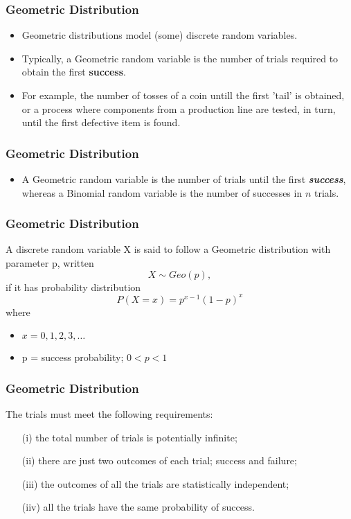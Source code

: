 \documentclass{beamer}
\begin{document}
\begin{frame}

\end{frame}
\begin{frame}
\frametitle{Geometric Distribution}
\Large
\begin{itemize}

\item Geometric distributions model (some) discrete random variables.
\item  Typically, a Geometric random variable is the number of trials required to obtain the first \textbf{success}.
\item For example, the number of tosses of a coin untill the first 'tail' is obtained, or a process where components from a production line are tested, in turn, until the first defective item is found.

\end{itemize}
\end{frame}
\begin{frame}
\frametitle{Geometric Distribution}
\Large
\begin{itemize}
\item A Geometric random variable is the number of trials until the first \textit{\textbf{success}}, whereas a Binomial random variable is the number of successes in $n$ trials.
\end{itemize}
\end{frame}
\begin{frame}
\frametitle{Geometric Distribution}
\Large
A discrete random variable X is said to follow a Geometric distribution with parameter p, written \[X \sim Geo(p),\] if it has probability distribution
\[P(X=x) = p^{x-1}(1-p)^x\]
where
\begin{itemize}
\item $x = 0, 1, 2, 3, \ldots$
\item p = success probability; $0 < p < 1$
\end{itemize}

\end{frame}
\begin{frame}
\frametitle{Geometric Distribution}
\Large
The trials must meet the following requirements:

\begin{itemize}
\item[(i)] the total number of trials is potentially infinite;
\item[(ii)] there are just two outcomes of each trial; success and failure;
\item[(iii)] the outcomes of all the trials are statistically independent;
\item[(iiv)] all the trials have the same probability of success.
\end{itemize}

\end{frame}
\end{document}
